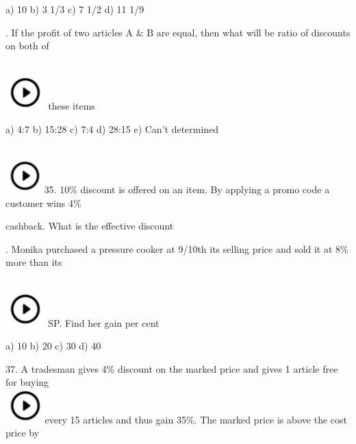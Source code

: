 \documentclass{article} %
\begin{document}
\noindent 

\noindent a)  10                       b) 3 1/3             c) 7 1/2             d) 11 1/9

\noindent 

. If the profit of two articles A \& B are equal, then what will be ratio of discounts on both of 

 
\noindent \\ \includegraphics*[width=0.60in, height=0.52in]{images/image1} these items

\noindent a) 4:7                       b) 15:28            c) 7:4                 d) 28:15            e) Can't determined

\noindent 

\noindent 

\noindent 
 
\noindent \\ \includegraphics*[width=0.59in, height=0.52in]{images/image1}35. 10\%  discount  is  offered  on  an  item.  By  applying  a  promo  code  a  customer  wins  4\%

\noindent 

\noindent cashback. What is the effective discount

\noindent 

\noindent 

. Monika purchased a pressure cooker at 9/10th its selling price and sold it at 8\% more than its

\noindent 
 
\noindent \\ \includegraphics*[width=0.60in, height=0.52in]{images/image1} SP. Find her gain per cent

\noindent a) 10                        b) 20                 c) 30                  d) 40

37. A tradesman gives 4\% discount on the marked price and gives 1 article free for buying  
\noindent \\ \includegraphics*[width=0.60in, height=0.52in]{images/image1}every 15 articles and thus gain 35\%. The marked price is above the cost price by
\end{document}
